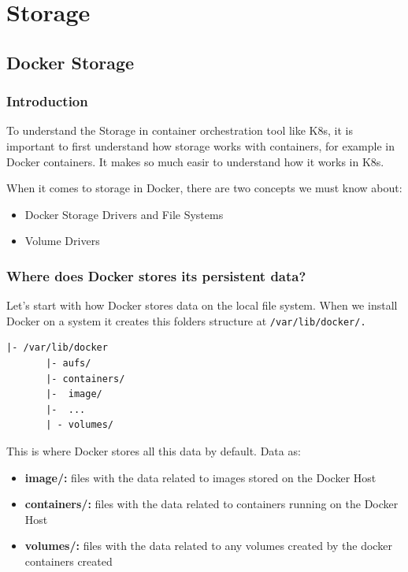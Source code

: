 \documentclass{article}
\newenvironment{codetemplate}[1][]{%
  \mybasecolorbox[#1]
  \itshape
}{%
  \endmybasecolorbox
}
\begin{document}
\newpage
\section{Storage}

\subsection{Docker Storage}

\subsubsection{Introduction}

To understand the Storage in container orchestration tool like K8s, it is important to first understand how storage works with containers, for example in Docker containers. It makes so much easir to understand how it works in K8s.

When it comes to storage in Docker, there are two concepts we must know about:
\begin{itemize}
    \item Docker Storage Drivers and File Systems
    \item Volume Drivers
\end{itemize}

\subsubsection{Where does Docker stores its persistent data?}
Let's start with how Docker stores data on the local file system. When we install Docker on a system it creates this folders structure at \verb|/var/lib/docker/.|

\begin{codetemplate}{}
\begin{verbatim}
|- /var/lib/docker
       |- aufs/
       |- containers/
       |-  image/
       |-  ...
       | - volumes/
\end{verbatim}
\end{codetemplate}

This is where Docker stores all this data by default. Data as:

\begin{itemize}
    \item\textbf{image/:}  files with the data related to images stored on the Docker Host
    \item \textbf{containers/:} files with the data related to containers running on the Docker Host
    \item \textbf{volumes/:} files with the data related to any volumes created by the docker containers created
\end{itemize}
\end{document}
